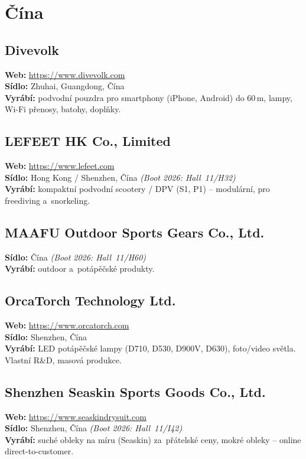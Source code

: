 \documentclass[11pt,a4paper]{article}
\begin{document}
\section{Čína}

\subsection{Divevolk}
\textbf{Web:} \url{https://www.divevolk.com} \\
\textbf{Sídlo:} Zhuhai, Guangdong, Čína \\
\textbf{Vyrábí:} podvodní pouzdra pro smartphony (iPhone, Android) do 60\,m, lampy, Wi-Fi přenosy, batohy, doplňky.

\subsection{LEFEET HK Co., Limited}
\textbf{Web:} \url{https://www.lefeet.com} \\
\textbf{Sídlo:} Hong Kong / Shenzhen, Čína \quad\emph{(Boot 2026: Hall~11/H32)} \\
\textbf{Vyrábí:} kompaktní podvodní scootery / DPV (S1, P1) -- modulární, pro freediving a~snorkeling.

\subsection{MAAFU Outdoor Sports Gears Co., Ltd.}
\textbf{Sídlo:} Čína \quad\emph{(Boot 2026: Hall~11/H60)} \\
\textbf{Vyrábí:} outdoor a~potápěčské produkty.

\subsection{OrcaTorch Technology Ltd.}
\textbf{Web:} \url{https://www.orcatorch.com} \\
\textbf{Sídlo:} Shenzhen, Čína \\
\textbf{Vyrábí:} LED potápěčské lampy (D710, D530, D900V, D630), foto/video světla. Vlastní R\&D, masová produkce.

\subsection{Shenzhen Seaskin Sports Goods Co., Ltd.}
\textbf{Web:} \url{https://www.seaskindrysuit.com} \\
\textbf{Sídlo:} Shenzhen, Čína \quad\emph{(Boot 2026: Hall~11/I42)} \\
\textbf{Vyrábí:} suché obleky na míru (Seaskin) za~přátelské ceny, mokré obleky -- online direct-to-customer.
\end{document}
